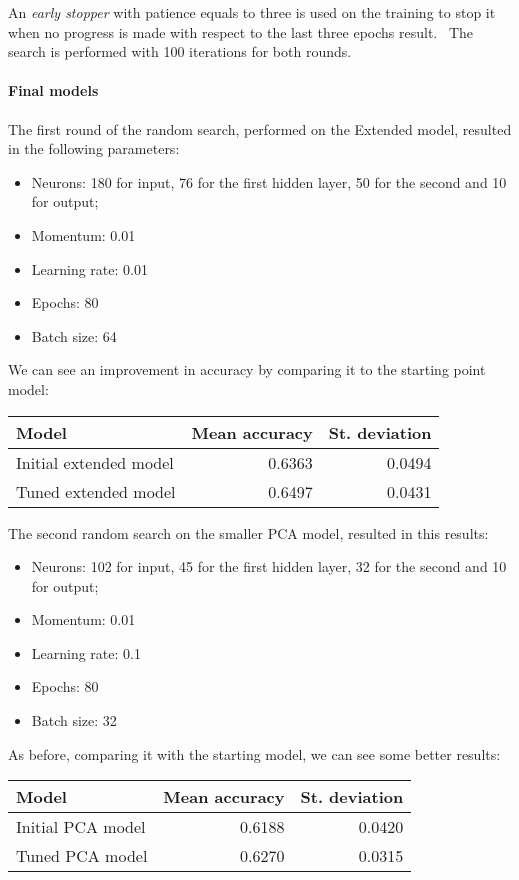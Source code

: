An \emph{early stopper} with patience equals to three is used on the training to stop it when no progress is made with 
respect to the last three epochs result.~\cite{early}
The search is performed with 100 iterations for both rounds.

\paragraph{Final models}
The first round of the random search, performed on the Extended model, resulted 
in the following parameters:
\begin{itemize}
    \item Neurons: 180 for input, 76 for the first hidden layer, 50 for the second and 10 for output;
    \item Momentum: 0.01
    \item Learning rate: 0.01
    \item Epochs: 80
    \item Batch size: 64
\end{itemize}
We can see an improvement in accuracy by comparing it to the starting point model:
\begin{center}
    \begin{tabular}{ |l|r|r| } 
        \hline
        Model & Mean accuracy & St. deviation \\
        \hline
        Initial extended model & 0.6363 & 0.0494\\
        Tuned extended model & 0.6497 & 0.0431\\
        \hline
    \end{tabular}
\end{center}

The second random search on the smaller PCA model, resulted in this results:
\begin{itemize}
    \item Neurons: 102 for input, 45 for the first hidden layer, 32 for the second and 10 for output;
    \item Momentum: 0.01
    \item Learning rate: 0.1
    \item Epochs: 80
    \item Batch size: 32
\end{itemize}
As before, comparing it with the starting model, we can see some better results:
\begin{center}
    \begin{tabular}{ |l|r|r| } 
        \hline
        Model & Mean accuracy & St. deviation \\
        \hline
        Initial PCA model & 0.6188 & 0.0420\\
        Tuned PCA model & 0.6270 & 0.0315\\
        \hline
    \end{tabular}
\end{center}

